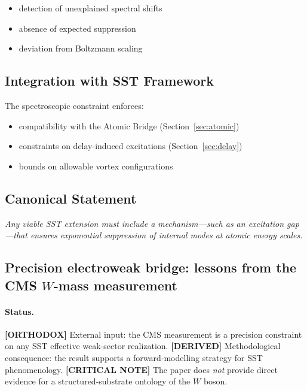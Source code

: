 \documentclass[11pt]{article}
\theoremstyle{definition}
\theoremstyle{plain}
\theoremstyle{remark}
\begin{document}
        \begin{itemize}
            \item detection of unexplained spectral shifts
            \item absence of expected suppression
            \item deviation from Boltzmann scaling
        \end{itemize}
    
    \subsection{Integration with SST Framework}
        
        The spectroscopic constraint enforces:
        
        \begin{itemize}
            \item compatibility with the Atomic Bridge (Section~\ref{sec:atomic})
            \item constraints on delay-induced excitations (Section~\ref{sec:delay})
            \item bounds on allowable vortex configurations
        \end{itemize}
    
    \subsection{Canonical Statement}
        
        \begin{center}
            \textit{
                Any viable SST extension must include a mechanism—such as an excitation gap—that ensures exponential suppression of internal modes at atomic energy scales.
            }
        \end{center}

    \subsection{Precision electroweak bridge: lessons from the CMS \texorpdfstring{$W$}{W}-mass measurement}
        \label{subsec:cms-w-mass-bridge}
    
        \paragraph{Status.}
            \textbf{[ORTHODOX]} External input: the CMS measurement is a precision constraint on any SST effective weak-sector realization.
            \textbf{[DERIVED]} Methodological consequence: the result supports a forward-modelling strategy for SST phenomenology.
            \textbf{[CRITICAL NOTE]} The paper does \emph{not} provide direct evidence for a structured-substrate ontology of the $W$ boson.
    
\end{document}

